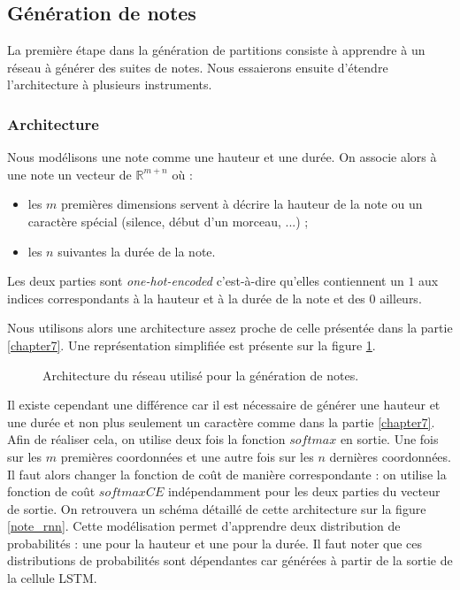 \subsection{Génération de notes}

La première étape dans la génération de partitions consiste à apprendre à un réseau à générer des suites de notes. Nous essaierons ensuite d'étendre l'architecture à plusieurs instruments.

\subsubsection{Architecture}

Nous modélisons une note comme une hauteur et une durée. On associe alors à une note un vecteur de $\mathbb{R}^{m+n}$ où :
\begin{itemize}
\item les $m$ premières dimensions servent à décrire la hauteur de la note ou un caractère spécial (silence, début d'un morceau, ...) ;
\item les $n$ suivantes la durée de la note.
\end{itemize}
Les deux parties sont \textit{one-hot-encoded} c'est-à-dire qu'elles contiennent un $1$ aux indices correspondants à la hauteur et à la durée de la note et des $0$ ailleurs.

Nous utilisons alors une architecture assez proche de celle présentée dans la partie \ref{chapter7}. Une représentation simplifiée est présente sur la figure \ref{note_rnn_simplified}.

\begin{figure}[h!]
\begin{center}

\caption{Architecture du réseau utilisé pour la génération de notes.}
\label{note_rnn_simplified}
\end{center}
\end{figure}

Il existe cependant une différence car il est nécessaire de générer une hauteur et une durée et non plus seulement un caractère comme dans la partie \ref{chapter7}. Afin de réaliser cela, on utilise deux fois la fonction $softmax$ en sortie. Une fois sur les $m$ premières coordonnées et une autre fois sur les $n$ dernières coordonnées. Il faut alors changer la fonction de coût de manière correspondante : on utilise la fonction de coût $softmaxCE$ indépendamment pour les deux parties du vecteur de sortie. On retrouvera un schéma détaillé de cette architecture sur la figure \ref{note_rnn}. Cette modélisation permet d'apprendre deux distribution de probabilités : une pour la hauteur et une pour la durée. Il faut noter que ces distributions de probabilités sont dépendantes car générées à partir de la sortie de la cellule LSTM.

